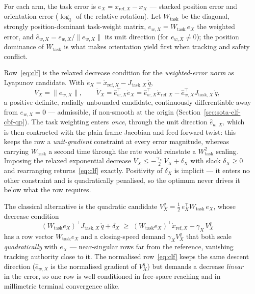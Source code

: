 \documentclass[12pt,a4paper,twoside,openright]{report}
\newcommand{\qdot}{\dot{q}}
\begin{document}
For each arm, the task error is $e_X = x_{\text{ref},X} - x_X$ --- stacked position error and orientation error ($\log_3$ of the relative rotation). Let $W_{\text{task}}$ be the diagonal, strongly position-dominant task-weight matrix, $e_{w,X} = W_{\text{task}}\,e_X$ the weighted error, and $\hat{e}_{w,X} = e_{w,X}/\|e_{w,X}\|$ its unit direction (for $e_{w,X} \neq 0$); the position dominance of $W_{\text{task}}$ is what makes orientation yield first when tracking and safety conflict.

Row~\eqref{eq:clf} is the relaxed decrease condition for the \emph{weighted-error norm} as Lyapunov candidate. With $\dot{e}_X = \dot{x}_{\text{ref},X} - J_{\text{task},X}\,\qdot$,
\begin{equation}
V_X = \|e_{w,X}\|,
\qquad
\dot{V}_X = \hat{e}_{w,X}^{\top}\dot{e}_X
= \hat{e}_{w,X}^{\top}\dot{x}_{\text{ref},X} - \hat{e}_{w,X}^{\top} J_{\text{task},X}\,\qdot,
\label{eq:clfnorm}
\end{equation}
a positive-definite, radially unbounded candidate, continuously differentiable away from $e_{w,X} = 0$ --- admissible, if non-smooth at the origin (Section~\ref{sec:sota-clf-cbf-qp}). The task weighting enters \emph{once}, through the unit direction $\hat{e}_{w,X}$, which is then contracted with the plain frame Jacobian and feed-forward twist: this keeps the row a \emph{unit-gradient} constraint at every error magnitude, whereas carrying $W_{\text{task}}$ a second time through the rate would reinstate a $W_{\text{task}}^2$ scaling. Imposing the relaxed exponential decrease $\dot{V}_X \le -\tfrac{\gamma_X}{2}\,V_X + \delta_X$ with slack $\delta_X \ge 0$ and rearranging returns~\eqref{eq:clf} exactly. Positivity of $\delta_X$ is implicit --- it enters no other constraint and is quadratically penalised, so the optimum never drives it below what the row requires.

The classical alternative is the quadratic candidate $V_X^{q} = \tfrac{1}{2}\,e_X^{\top} W_{\text{task}}\,e_X$, whose decrease condition
\begin{equation}
(W_{\text{task}}e_X)^{\top} J_{\text{task},X}\,\qdot + \delta_X
\;\ge\;
(W_{\text{task}}e_X)^{\top}\dot{x}_{\text{ref},X} + \gamma_X\, V_X^{q}
\label{eq:clfquad}
\end{equation}
has a row vector $W_{\text{task}}e_X$ and a closing-speed demand $\gamma_X V_X^{q}$ that both scale \emph{quadratically} with $e_X$ --- near-singular rows far from the reference, vanishing tracking authority close to it. The normalised row~\eqref{eq:clf} keeps the same descent direction ($\hat{e}_{w,X}$ is the normalised gradient of $V_X^{q}$) but demands a decrease \emph{linear} in the error, so one row is well conditioned in free-space reaching and in millimetric terminal convergence alike.
\end{document}
